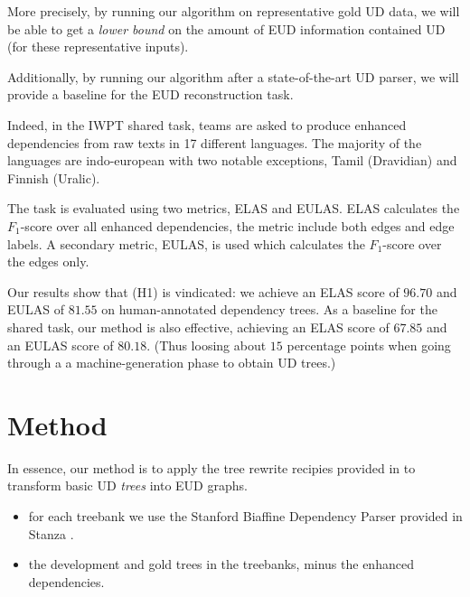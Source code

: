 \documentclass[11pt,a4paper]{article}
\begin{document}
More precisely, by running our algorithm on representative gold UD
data, we will be able to get a \emph{lower bound} on the amount of EUD
information contained UD (for these representative inputs).

Additionally, by running our algorithm after a state-of-the-art UD
parser, we will provide a baseline for the EUD reconstruction task.


Indeed, in the IWPT shared task, teams are asked to produce enhanced
dependencies from raw texts in 17 different languages. The
majority of the languages are indo-european with two notable
exceptions, Tamil (Dravidian) and Finnish (Uralic).

The task is evaluated using two metrics, ELAS and EULAS. ELAS
calculates the $F_1$-score over all enhanced dependencies, the
metric include both edges and edge labels. A secondary metric,
EULAS, is used which calculates the $F_1$-score over the edges
only.


Our results show that (H1) is vindicated: we achieve an ELAS score of
$96.70$ and EULAS of $81.55$ on human-annotated dependency trees.  As
a baseline for the shared task, our method is also effective,
achieving an ELAS score of $67.85$ and an EULAS score of
$80.18$. (Thus loosing about $15$ percentage points when going through
a a machine-generation phase to obtain UD trees.)

    



\section{Method}
In essence, our method is to apply the tree rewrite recipies
provided in \citep{schuster2016enhanced} to transform basic UD
\emph{trees} into EUD graphs.



    
\begin{itemize}
\item for each treebank we use the Stanford Biaffine Dependency
Parser \citep{dozat2016deep} provided in Stanza
\citep{qi2020stanza}.
\item
the development and gold trees in the treebanks, minus the enhanced
dependencies.
\end{itemize}
\end{document}
